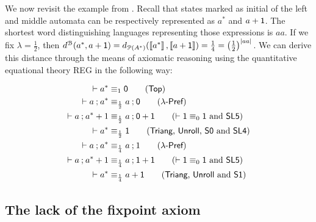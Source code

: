 We now revisit the example from . Recall that states marked as initial of the left and middle automata can be respectively represented as $a^\ast$ and $a + \mathsf{1}$. The shortest word distinguishing languages representing those expressions is $aa$. If we fix $\lambda = \frac{1}{2}$, then $d^{\mathcal{B}}(a^\ast, a + \mathsf{1})= d_{\mathcal{P}({A}^{\ast})}(\left\llbracket{a^\ast}\right\rrbracket, \left\llbracket{a+ \mathsf{1}}\right\rrbracket) = \frac{1}{4}=\left(\frac{1}{2}\right)^{|aa|}$. We can derive this distance through the means of axiomatic reasoning using the quantitative equational theory \textsf{REG} in the following way: 
\begin{example}
 	\begin{align*}
		\vdash a^* &\equiv_1 \zero \tag{$\Top$} \\
		\vdash a \seq a^{\ast} &\equiv_{\frac{1}{2}} a \seq \zero\tag{$\dPref$}\\
		\vdash a \seq a^\ast + 1&\equiv_{\frac{1}{2}} a \seq \zero + \one  \tag{$\vdash \one \equiv_0 \one$ and \textsf{SL5}}\\
		\vdash a^{\ast} &\equiv_{\frac{1}{2}} \one \tag{$\Triang$, \textsf{Unroll}, \textsf{S0} and \textsf{SL4}}\\
		\vdash a \seq a^\ast &\equiv_{\frac{1}{4}} a \seq 1 \tag{$\dPref$}\\
		\vdash a \seq a^\ast + 1 &\equiv_{\frac{1}{4}} a \seq \one + \one  \tag{$\vdash \one \equiv_0 \one$ and \textsf{SL5}}\\
		\vdash a^\ast &\equiv_{\frac{1}{4}} a + \one \tag{$\Triang$, \textsf{Unroll} and \textsf{S1}}\\
	\end{align*}
\end{example}
\subsection{The lack of the fixpoint axiom}\label{c2:subsec:fixpoint_axiom}

